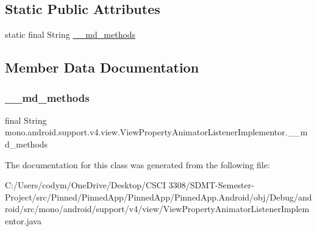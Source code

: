 \subsection*{Static Public Attributes}
\begin{DoxyCompactItemize}
\item 
static final String \hyperlink{classmono_1_1android_1_1support_1_1v4_1_1view_1_1_view_property_animator_listener_implementor_ab6738444d210e9579be376595ecb6c38}{\+\_\+\+\_\+md\+\_\+methods}
\end{DoxyCompactItemize}


\subsection{Member Data Documentation}
\mbox{\label{classmono_1_1android_1_1support_1_1v4_1_1view_1_1_view_property_animator_listener_implementor_ab6738444d210e9579be376595ecb6c38}} 
\subsubsection{\texorpdfstring{\+\_\+\+\_\+md\+\_\+methods}{\_\_md\_methods}}
{\footnotesize\ttfamily final String mono.\+android.\+support.\+v4.\+view.\+View\+Property\+Animator\+Listener\+Implementor.\+\_\+\+\_\+md\+\_\+methods\hspace{0.3cm}{\ttfamily [static]}}



The documentation for this class was generated from the following file\+:\begin{DoxyCompactItemize}
\item 
C\+:/\+Users/codym/\+One\+Drive/\+Desktop/\+C\+S\+C\+I 3308/\+S\+D\+M\+T-\/\+Semester-\/\+Project/src/\+Pinned/\+Pinned\+App/\+Pinned\+App/\+Pinned\+App.\+Android/obj/\+Debug/android/src/mono/android/support/v4/view/View\+Property\+Animator\+Listener\+Implementor.\+java\end{DoxyCompactItemize}
